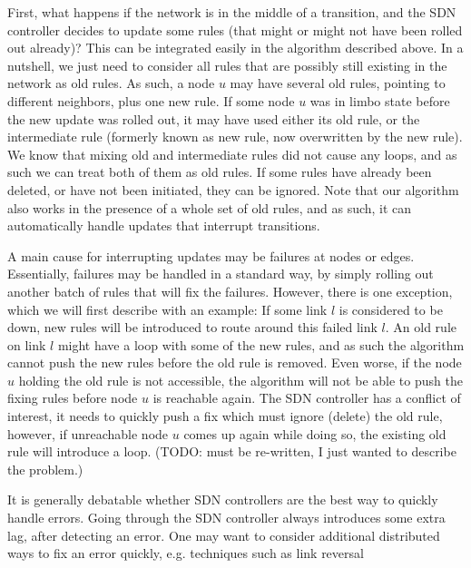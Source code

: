 First, what happens if the network is in the middle of a transition, and the SDN controller decides to update some rules (that might or might not have been rolled out already)? This can be integrated easily in the algorithm described above. In a nutshell, we just need to consider all rules that are possibly still existing in the network as old rules. As such, a node $u$ may have several old rules, pointing to different neighbors, plus one new rule. If some node $u$ was in limbo state before the new update was rolled out, it may have used either its old rule, or the intermediate rule (formerly known as new rule, now overwritten by the new rule). We know that mixing old and intermediate rules did not cause any loops, and as such we can treat both of them as old rules. If some rules have already been deleted, or have not been initiated, they can be ignored. Note that our algorithm also works in the presence of a whole set of old rules, and as such, it can automatically handle updates that interrupt transitions.

A main cause for interrupting updates may be failures at nodes or edges. Essentially, failures may be handled in a standard way, by simply rolling out another batch of rules that will fix the failures. However, there is one exception, which we will first describe with an example: If some link $l$ is considered to be down, new rules will be introduced to route around this failed link $l$. An old rule on link $l$ might have a loop with some of the new rules, and as such the algorithm cannot push the new rules before the old rule is removed. Even worse, if the node $u$ holding the old rule is not accessible, the algorithm will not be able to push the fixing rules before node $u$ is reachable again. The SDN controller has a conflict of interest, it needs to quickly push a fix which must ignore (delete) the old rule, however, if unreachable node $u$ comes up again while doing so, the existing old rule will introduce a loop. (TODO: must be re-written, I just wanted to describe the problem.)

It is generally debatable whether SDN controllers are the best way to quickly handle errors. Going through the SDN controller always introduces some extra lag, after detecting an error. One may want to consider additional distributed ways to fix an error quickly, e.g. techniques such as link reversal \cite{originallinkreversalpaperforinstanceorsomethingnewer}

